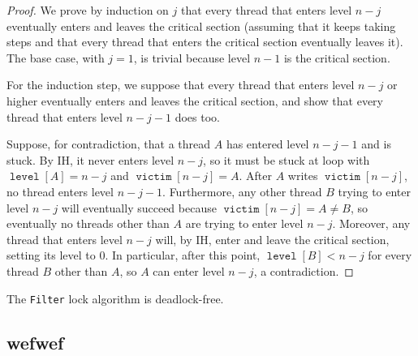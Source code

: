 \documentclass[11pt]{article}
\DeclareMathOperator{\victim}{\texttt{victim}}
\DeclareMathOperator{\tlevel}{\texttt{level}}
\begin{document}
\begin{proof}
We prove by induction on \(j\) that every thread that enters level \(n-j\) eventually enters and
leaves the critical section (assuming that it keeps taking steps and that every thread that enters the
critical section eventually leaves it). The base case, with \(j=1\), is trivial because level \(n-1\)
is the critical section.

For the induction step, we suppose that every thread that enters level \(n-j\) or higher eventually
enters and leaves the critical section, and show that every thread that enters level \(n-j-1\) does
too.

Suppose, for contradiction, that a thread \(A\) has entered level \(n-j-1\) and is stuck. By IH, it
never enters level \(n-j\), so it must be stuck at loop with \(\tlevel[A]=n-j\) and
\(\victim[n-j]=A\). After \(A\) writes \(\victim[n-j]\), no thread enters level \(n-j-1\).
Furthermore, any other thread \(B\) trying to enter level \(n-j\) will eventually succeed because
\(\victim[n-j]=A\neq B\), so eventually no threads other than \(A\) are trying to enter level \(n-j\).
Moreover, any thread that enters level \(n-j\) will, by IH, enter and leave the critical section,
setting its level to 0. In particular, after this point, \(\tlevel[B]<n-j\) for every thread \(B\)
other than \(A\), so \(A\) can enter level \(n-j\), a contradiction.
\end{proof}

\begin{corollary}[]
The \texttt{Filter} lock algorithm is deadlock-free.
\end{corollary}
\subsection{wefwef}
\label{sec:org5c03170}
\end{document}
